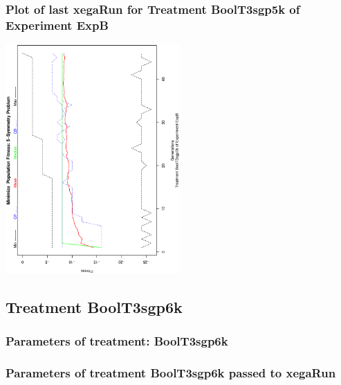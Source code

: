 \documentclass[18pt,c]{beamer}
\makeatletter
\def\beamer@writeslidentry@miniframesoff{%
  \expandafter\beamer@ifempty\expandafter{\beamer@framestartpage}{}%
  {%
   \clearpage\beamer@notesactions%
  }
}
\newcommand*{\miniframesoff}{\let\beamer@writeslidentry=\beamer@writeslidentry@miniframesoff}
\makeatother
\begin{document}
 \begin{frame}
 \frametitle{ Plot of last xegaRun for Treatment BoolT3sgp5k of Experiment ExpB }
 \begin{center}
\includegraphics[width=0.5\textwidth, angle=-90]
{ExpBPlotPopStatsFigure018.eps}
 \end{center}
 \label{report/ExpBPlotPopStatsFigure018.eps}  
 \end{frame}

\miniframesoff
\subsection{Treatment BoolT3sgp6k}

 \begin{frame}
 \fontsize{8pt}{9pt}\selectfont
 \frametitle{  Parameters of treatment: BoolT3sgp6k 
 }

 \label{ExpBtParmTable076.tex}  
 \end{frame}


 \begin{frame}
 \fontsize{8pt}{9pt}\selectfont
 \frametitle{  Parameters of treatment BoolT3sgp6k passed to xegaRun
 }

 \label{ExpBtParmTable077.tex}  
 \end{frame}
\end{document}
